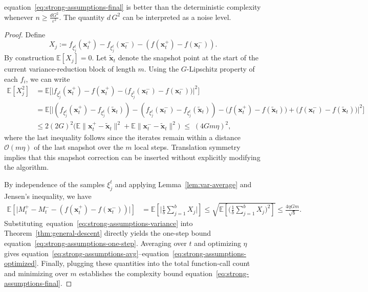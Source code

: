 \documentclass[twoside]{article}
\theoremstyle{plain}
\theoremstyle{definition}
\theoremstyle{remark}
\def\eqref#1{equation~\ref{#1}}
\def\cO{{\mathcal{O}}}
\def\vx{{\bm{x}}}
\newcommand{\E}{\mathbb{E}}
\begin{document}
\eqref{eq:strong-assumptions-final} is better than the deterministic complexity whenever $n\geq \tfrac{d G^2}{\varepsilon^2}.$ The quantity $d\,G^2$ can be interpreted as a noise level.

\begin{proof}
Define
\[
X_j := f_{\xi^t_j}(\vx_t^+) - f_{\xi^t_j}(\vx_t^-) - (f(\vx_t^+) - f(\vx_t^-)).
\]
By construction $\E[X_j]=0$.  
Let $\tilde{\vx}_t$ denote the snapshot point at the start of the current
variance-reduction block of length $m$. Using the $G$-Lipschitz property of each
$f_i$, we can write
\begin{align*}
\E[X_j^2]
&= \E\Big[
  \big|
    f_{\xi^t_j}(\vx_t^+) - f(\vx_t^+)
    - \big(f_{\xi^t_j}(\vx_t^-) - f(\vx_t^-)\big)
  \big|^2
\Big] \\
&= \E\Big[
  \big|
    (f_{\xi^t_j}(\vx_t^+) - f_{\xi^t_j}(\tilde{\vx}_t))
    - (f_{\xi^t_j}(\vx_t^-) - f_{\xi^t_j}(\tilde{\vx}_t))
    - \big(f(\vx_t^+) - f(\tilde{\vx}_t)\big)
    + \big(f(\vx_t^-) - f(\tilde{\vx}_t)\big)
  \big|^2
\Big] \\
&\le 2(2G)^2\big(
  \E\|\vx_t^+ - \tilde{\vx}_t\|^2
  + \E\|\vx_t^- - \tilde{\vx}_t\|^2
\big)
\;\le\; (4 G m \eta)^2,
\end{align*}
where the last inequality follows since the iterates remain within a distance
$\cO(m\eta)$ of the last snapshot over the $m$ local steps.  
Translation symmetry implies that this snapshot correction can be inserted
without explicitly modifying the algorithm.

By independence of the samples $\xi^t_j$ and
applying Lemma~\ref{lem:var-average} and Jensen's inequality, we have
\begin{align}
\E\!\left[
    \big|
        M_t^+ - M_t^- - (f(\vx_t^+) - f(\vx_t^-))
    \big|
\right]
&= \E\!\left[\Big|\frac{1}{b}\sum_{j=1}^b X_j\Big|\right]
\le \sqrt{\E\!\left[\Big(\frac{1}{b}\sum_{j=1}^b X_j\Big)^2\right]}
\le \frac{4 \eta G m}{\sqrt{b}}.
\label{eq:strong-assumptions-variance}
\end{align}
Substituting~\eqref{eq:strong-assumptions-variance} into
Theorem~\ref{thm:general-descent} directly yields the one-step bound
\eqref{eq:strong-assumptions-one-step}.  
Averaging over $t$ and optimizing $\eta$ gives
\eqref{eq:strong-assumptions-avg}--\eqref{eq:strong-assumptions-optimized}.
Finally, plugging these quantities into the total function-call count and
minimizing over $m$ establishes the complexity bound
\eqref{eq:strong-assumptions-final}.
\end{proof}
\end{document}
